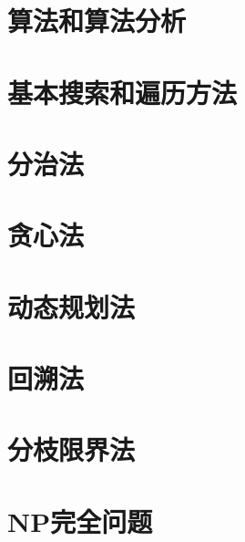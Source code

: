 \chapter{算法和算法分析}

\chapter{基本搜索和遍历方法}

\chapter{分治法}

\chapter{贪心法}

\chapter{动态规划法}

\chapter{回溯法}

\chapter{分枝限界法}

\chapter{NP完全问题}
